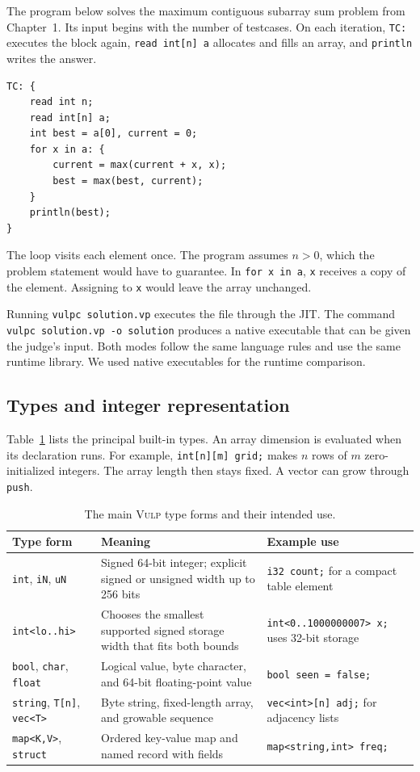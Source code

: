 \documentclass[12pt,a4paper]{report}
\newcommand{\vulp}{\textsc{Vulp}}
\begin{document}
The program below solves the maximum contiguous subarray sum problem from Chapter~1. Its input begins with the number of testcases. On each iteration, \texttt{TC:} executes the block again, \texttt{read int[n] a} allocates and fills an array, and \texttt{println} writes the answer.
\begin{verbatim}
TC: {
    read int n;
    read int[n] a;
    int best = a[0], current = 0;
    for x in a: {
        current = max(current + x, x);
        best = max(best, current);
    }
    println(best);
}
\end{verbatim}
The loop visits each element once. The program assumes $n>0$, which the problem statement would have to guarantee. In \texttt{for x in a}, \texttt{x} receives a copy of the element. Assigning to \texttt{x} would leave the array unchanged.

Running \texttt{vulpc solution.vp} executes the file through the JIT. The command \texttt{vulpc solution.vp -o solution} produces a native executable that can be given the judge's input. Both modes follow the same language rules and use the same runtime library. We used native executables for the runtime comparison.

\subsection{Types and integer representation}
Table~\ref{tab:types} lists the principal built-in types. An array dimension is evaluated when its declaration runs. For example, \texttt{int[n][m] grid;} makes $n$ rows of $m$ zero-initialized integers. The array length then stays fixed. A vector can grow through \texttt{push}.

\begin{table}[htbp]
\centering\small
\begin{tabular}{|>{\raggedright\arraybackslash}p{32mm}|>{\raggedright\arraybackslash}p{47mm}|>{\raggedright\arraybackslash}p{60mm}|}
\hline
Type form & Meaning & Example use\\\hline
\texttt{int}, \texttt{iN}, \texttt{uN} & Signed 64-bit integer; explicit signed or unsigned width up to 256 bits & \texttt{i32 count;} for a compact table element\\\hline
\texttt{int<lo..hi>} & Chooses the smallest supported signed storage width that fits both bounds & \texttt{int<0..1000000007> x;} uses 32-bit storage\\\hline
\texttt{bool}, \texttt{char}, \texttt{float} & Logical value, byte character, and 64-bit floating-point value & \texttt{bool seen = false;}\\\hline
\texttt{string}, \texttt{T[n]}, \texttt{vec<T>} & Byte string, fixed-length array, and growable sequence & \texttt{vec<int>[n] adj;} for adjacency lists\\\hline
\texttt{map<K,V>}, \texttt{struct} & Ordered key-value map and named record with fields & \texttt{map<string,int> freq;}\\\hline
\end{tabular}
\caption{The main \vulp{} type forms and their intended use.}
\label{tab:types}
\end{table}
\end{document}

